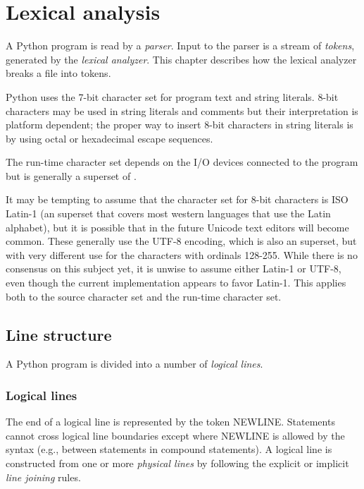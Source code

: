 \chapter{Lexical analysis\label{lexical}}

A Python program is read by a \emph{parser}.  Input to the parser is a
stream of \emph{tokens}, generated by the \emph{lexical analyzer}.  This
chapter describes how the lexical analyzer breaks a file into tokens.

Python uses the 7-bit \ASCII{} character set for program text and string
literals. 8-bit characters may be used in string literals and comments
but their interpretation is platform dependent; the proper way to
insert 8-bit characters in string literals is by using octal or
hexadecimal escape sequences.

The run-time character set depends on the I/O devices connected to the
program but is generally a superset of \ASCII{}.

 It may be tempting to assume that the
character set for 8-bit characters is ISO Latin-1 (an \ASCII{}
superset that covers most western languages that use the Latin
alphabet), but it is possible that in the future Unicode text editors
will become common.  These generally use the UTF-8 encoding, which is
also an \ASCII{} superset, but with very different use for the
characters with ordinals 128-255.  While there is no consensus on this
subject yet, it is unwise to assume either Latin-1 or UTF-8, even
though the current implementation appears to favor Latin-1.  This
applies both to the source character set and the run-time character
set.


\section{Line structure\label{line-structure}}

A Python program is divided into a number of \emph{logical lines}.


\subsection{Logical lines\label{logical}}

The end of
a logical line is represented by the token NEWLINE.  Statements cannot
cross logical line boundaries except where NEWLINE is allowed by the
syntax (e.g., between statements in compound statements).
A logical line is constructed from one or more \emph{physical lines}
by following the explicit or implicit \emph{line joining} rules.


